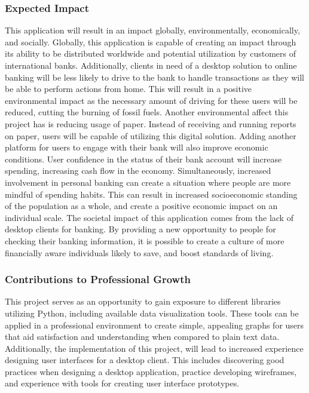 \subsubsection{Expected Impact}
\label{sect:expected_impact}
This application will result in an impact globally, environmentally, economically, and socially. 
Globally, this application is capable of creating an impact through its ability to be distributed worldwide and potential utilization by customers of international banks.
Additionally, clients in need of a desktop solution to online banking will be less likely to drive to the bank to handle transactions as they will be able to perform actions from home. This will result in a positive environmental impact as the necessary amount of driving for these users will be reduced, cutting the burning of fossil fuels. Another environmental affect this project has is reducing usage of paper. Instead of receiving and running reports on paper, users will be capable of utilizing this digital solution.
Adding another platform for users to engage with their bank will also improve economic conditions. User confidence in the status of their bank account will increase spending, increasing cash flow in the economy. Simultaneously, increased involvement in personal banking can create a situation where people are more mindful of spending habits. This can result in increased socioeconomic standing of the population as a whole, and create a positive economic impact on an individual scale.
The societal impact of this application comes from the lack of desktop clients for banking. By providing a new opportunity to people for checking their banking information, it is possible to create a culture of more financially aware individuals likely to save, and boost standards of living.


\subsubsection{Contributions to Professional Growth}
\label{sect:professional_growth}
This project serves as an opportunity to gain exposure to different libraries utilizing Python, including available data visualization tools. These tools can be applied in a professional environment to create simple, appealing graphs for users that aid satisfaction and understanding when compared to plain text data. Additionally, the implementation of this project, will lead to increased experience designing user interfaces for a desktop client. This includes discovering good practices when designing a desktop application, practice developing wireframes, and experience with tools for creating user interface prototypes.

